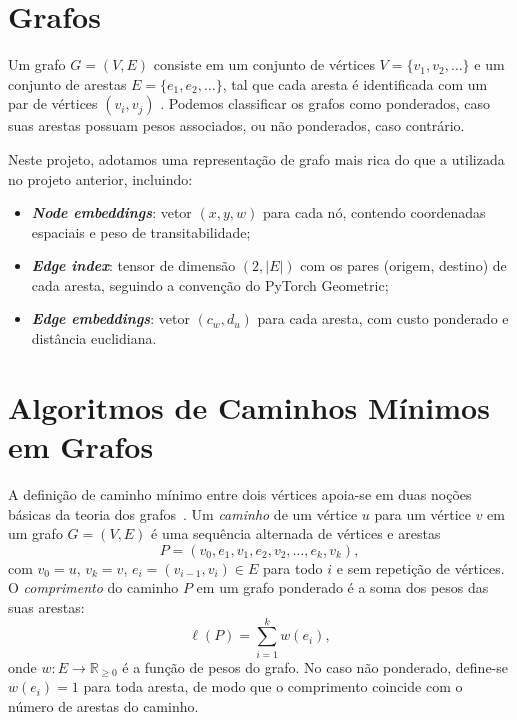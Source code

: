 \documentclass[
    12pt,
    openright,
    oneside,
    a4paper,
    english,
    brazil
]{abntex2}
\begin{document}
\section{Grafos}

Um grafo $G = (V, E)$ consiste em um conjunto de vértices $V = \{v_1, v_2, \ldots\}$ e um conjunto de arestas $E = \{e_1, e_2, \ldots\}$, tal que cada aresta é identificada com um par de vértices $(v_i, v_j)$ \cite{chen1997}. Podemos classificar os grafos como ponderados, caso suas arestas possuam pesos associados, ou não ponderados, caso contrário.

Neste projeto, adotamos uma representação de grafo mais rica do que a utilizada no projeto anterior, incluindo:
\begin{itemize}
    \item \textbf{\textit{Node embeddings}}: vetor $(x, y, w)$ para cada nó, contendo coordenadas espaciais e peso de transitabilidade;
    \item \textbf{\textit{Edge index}}: tensor de dimensão $(2, |E|)$ com os pares (origem, destino) de cada aresta, seguindo a convenção do PyTorch Geometric;
    \item \textbf{\textit{Edge embeddings}}: vetor $(c_w, d_u)$ para cada aresta, com custo ponderado e distância euclidiana.
\end{itemize}

\section{Algoritmos de Caminhos Mínimos em Grafos}

A definição de caminho mínimo entre dois vértices apoia-se em duas noções básicas da teoria dos grafos~\cite{deo2016, chen1997}. Um \emph{caminho} de um vértice $u$ para um vértice $v$ em um grafo $G = (V, E)$ é uma sequência alternada de vértices e arestas
\[
P = (v_0, e_1, v_1, e_2, v_2, \ldots, e_k, v_k),
\]
com $v_0 = u$, $v_k = v$, $e_i = (v_{i-1}, v_i) \in E$ para todo $i$ e sem repetição de vértices. O \emph{comprimento} do caminho $P$ em um grafo ponderado é a soma dos pesos das suas arestas:
\[
\ell(P) = \sum_{i=1}^{k} w(e_i),
\]
onde $w : E \to \mathbb{R}_{\geq 0}$ é a função de pesos do grafo. No caso não ponderado, define-se $w(e_i) = 1$ para toda aresta, de modo que o comprimento coincide com o número de arestas do caminho.
\end{document}
